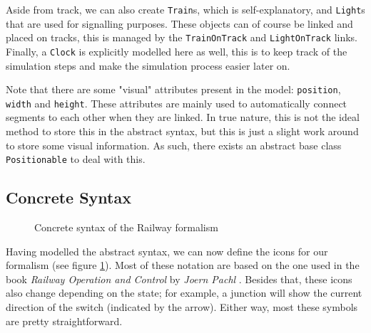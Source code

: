 \documentclass{article}
\begin{document}
Aside from track, we can also create \texttt{Train}s, which is self-explanatory, and \texttt{Light}s that are used for signalling purposes. These objects can of course be linked and placed on tracks, this is managed by the \texttt{TrainOnTrack} and \texttt{LightOnTrack} links. Finally, a \texttt{Clock} is explicitly modelled here as well, this is to keep track of the simulation steps and make the simulation process easier later on.

Note that there are some "visual" attributes present in the model: \texttt{position}, \texttt{width} and \texttt{height}. These attributes are mainly used to automatically connect segments to each other when they are linked. In true nature, this is not the ideal method to store this in the abstract syntax, but this is just a slight work around to store some visual information. As such, there exists an abstract base class \texttt{Positionable} to deal with this.

\subsection{Concrete Syntax}

\begin{figure}[H]
    \begin{center}
    \end{center}
    \caption{Concrete syntax of the Railway formalism}
    \label{concrete_syntax}
\end{figure}

Having modelled the abstract syntax, we can now define the icons for our formalism (see figure \ref{concrete_syntax}). Most of these notation are based on the one used in the book \textit{Railway Operation and Control} by \textit{Joern Pachl} \cite{railway_book}. Besides that, these icons also change depending on the state; for example, a junction will show the current direction of the switch (indicated by the arrow). Either way, most these symbols are pretty straightforward.
\end{document}

